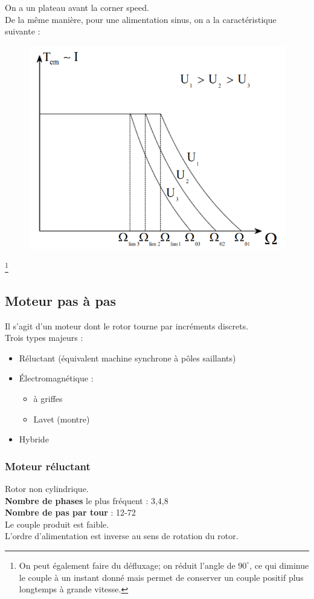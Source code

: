 \documentclass[../main.tex]{subfiles}
\begin{document}
On a un plateau avant la corner speed.\\

De la même manière, pour une alimentation sinus, on a la caractéristique suivante : \\

\begin{figure}[hbt!]
    \centering
    \includegraphics[width=.6\textwidth]{IMAGES/machineelec/Screenshot from 2023-11-25 00-42-03.png}
\end{figure}

\footnote{On peut également faire du défluxage; on réduit l'angle de $90^\circ$, ce qui diminue le couple à un instant donné mais permet de conserver un couple positif plus longtemps à grande vitesse.}

\subsection{Moteur pas à pas}
Il s'agit d'un moteur dont le rotor tourne par incréments discrets.\\
Trois types majeurs : \begin{itemize}
    \item Réluctant (équivalent machine synchrone à pôles saillants)\\
    \item Électromagnétique : \begin{itemize}
        \item à griffes\\
        \item Lavet (montre)\\
    \end{itemize}
    \item Hybride\\
\end{itemize}

\subsubsection{Moteur réluctant}
Rotor non cylindrique. \\
\textbf{Nombre de phases} le plus fréquent : 3,4,8\\
\textbf{Nombre de pas par tour} : 12-72\\
\warning Le couple produit est faible.\\
L'ordre d'alimentation est inverse au sens de rotation du rotor.\\
\end{document}

